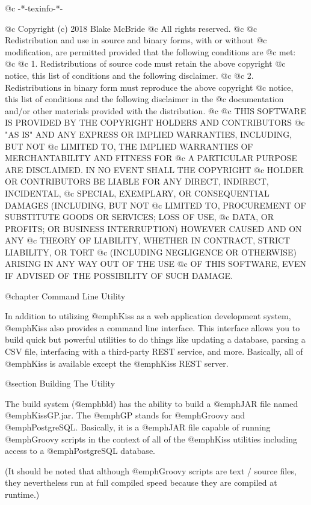 @c -*-texinfo-*-

@c  Copyright (c) 2018 Blake McBride
@c  All rights reserved.
@c
@c  Redistribution and use in source and binary forms, with or without
@c  modification, are permitted provided that the following conditions are
@c  met:
@c
@c  1. Redistributions of source code must retain the above copyright
@c  notice, this list of conditions and the following disclaimer.
@c
@c  2. Redistributions in binary form must reproduce the above copyright
@c  notice, this list of conditions and the following disclaimer in the
@c  documentation and/or other materials provided with the distribution.
@c
@c  THIS SOFTWARE IS PROVIDED BY THE COPYRIGHT HOLDERS AND CONTRIBUTORS
@c  "AS IS" AND ANY EXPRESS OR IMPLIED WARRANTIES, INCLUDING, BUT NOT
@c  LIMITED TO, THE IMPLIED WARRANTIES OF MERCHANTABILITY AND FITNESS FOR
@c  A PARTICULAR PURPOSE ARE DISCLAIMED. IN NO EVENT SHALL THE COPYRIGHT
@c  HOLDER OR CONTRIBUTORS BE LIABLE FOR ANY DIRECT, INDIRECT, INCIDENTAL,
@c  SPECIAL, EXEMPLARY, OR CONSEQUENTIAL DAMAGES (INCLUDING, BUT NOT
@c  LIMITED TO, PROCUREMENT OF SUBSTITUTE GOODS OR SERVICES; LOSS OF USE,
@c  DATA, OR PROFITS; OR BUSINESS INTERRUPTION) HOWEVER CAUSED AND ON ANY
@c  THEORY OF LIABILITY, WHETHER IN CONTRACT, STRICT LIABILITY, OR TORT
@c  (INCLUDING NEGLIGENCE OR OTHERWISE) ARISING IN ANY WAY OUT OF THE USE
@c  OF THIS SOFTWARE, EVEN IF ADVISED OF THE POSSIBILITY OF SUCH DAMAGE.


@chapter Command Line Utility

In addition to utilizing @emph{Kiss} as a web application development
system, @emph{Kiss} also provides a command line interface.  This interface
allows you to build quick but powerful utilities to do things like updating
a database, parsing a CSV file, interfacing with a third-party REST service,
and more.  Basically, all of @emph{Kiss} is available except the @emph{Kiss}
REST server.

@section Building The Utility

The build system (@emph{bld}) has the ability to build a @emph{JAR}
file named @emph{KissGP.jar}.  The @emph{GP} stands for @emph{Groovy}
and @emph{PostgreSQL}.  Basically, it is a @emph{JAR} file capable of
running @emph{Groovy} scripts in the context of all of the @emph{Kiss}
utilities including access to a @emph{PostgreSQL} database.

(It should be noted that although @emph{Groovy} scripts are text /
source files, they nevertheless run at full compiled speed because
they are compiled at runtime.)

